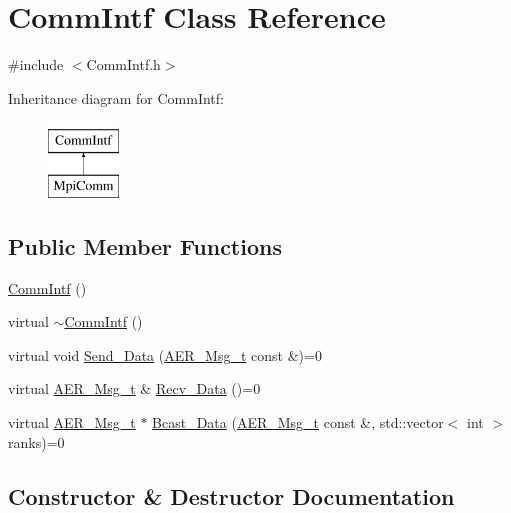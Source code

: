 \hypertarget{classCommIntf}{}\section{Comm\+Intf Class Reference}
\label{classCommIntf}


{\ttfamily \#include $<$Comm\+Intf.\+h$>$}

Inheritance diagram for Comm\+Intf\+:\begin{figure}[H]
\begin{center}
\leavevmode
\includegraphics[height=2.000000cm]{classCommIntf}
\end{center}
\end{figure}
\subsection*{Public Member Functions}
\begin{DoxyCompactItemize}
\item 
\mbox{\hyperlink{classCommIntf_aa1f0610186930d23cff2c53d5059d0f2}{Comm\+Intf}} ()
\item 
virtual \mbox{\hyperlink{classCommIntf_a036b261d1e2ff312a278f6498fe396f8}{$\sim$\+Comm\+Intf}} ()
\item 
virtual void \mbox{\hyperlink{classCommIntf_a86cc885716df0db3a644b2db2e2a72bb}{Send\+\_\+\+Data}} (\mbox{\hyperlink{structAER__Msg__t}{A\+E\+R\+\_\+\+Msg\+\_\+t}} const \&)=0
\item 
virtual \mbox{\hyperlink{structAER__Msg__t}{A\+E\+R\+\_\+\+Msg\+\_\+t}} \& \mbox{\hyperlink{classCommIntf_a910fdc340f2451051c492a7ee2803b84}{Recv\+\_\+\+Data}} ()=0
\item 
virtual \mbox{\hyperlink{structAER__Msg__t}{A\+E\+R\+\_\+\+Msg\+\_\+t}} $\ast$ \mbox{\hyperlink{classCommIntf_a9ed907991869cc7b6ebac4688d085147}{Bcast\+\_\+\+Data}} (\mbox{\hyperlink{structAER__Msg__t}{A\+E\+R\+\_\+\+Msg\+\_\+t}} const \&, std\+::vector$<$ int $>$ranks)=0
\end{DoxyCompactItemize}


\subsection{Constructor \& Destructor Documentation}
\mbox{\label{classCommIntf_aa1f0610186930d23cff2c53d5059d0f2}} 
